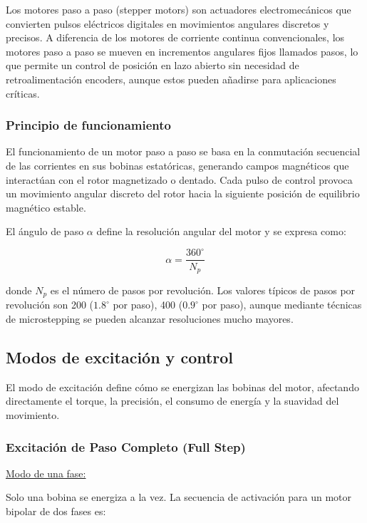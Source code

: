 
Los motores paso a paso (stepper motors) son actuadores electromecánicos que convierten pulsos eléctricos digitales en movimientos angulares discretos y precisos. A diferencia de los motores de corriente continua convencionales, los motores paso a paso se mueven en incrementos angulares fijos llamados pasos, lo que permite un control de posición en lazo abierto sin necesidad de retroalimentación encoders, aunque estos pueden añadirse para aplicaciones críticas.

\subsubsection{Principio de funcionamiento}

El funcionamiento de un motor paso a paso se basa en la conmutación secuencial de las corrientes en sus bobinas estatóricas, generando campos magnéticos que interactúan con el rotor magnetizado o dentado. Cada pulso de control provoca un movimiento angular discreto del rotor hacia la siguiente posición de equilibrio magnético estable.

El ángulo de paso $\alpha$ define la resolución angular del motor y se expresa como:

\begin{equation}
\alpha = \frac{360^\circ}{N_p}
\end{equation}

donde $N_p$ es el número de pasos por revolución. Los valores típicos de pasos por revolución son 200 ($1.8^\circ$ por paso), 400 ($0.9^\circ$ por paso), aunque mediante técnicas de microstepping se pueden alcanzar resoluciones mucho mayores.

\subsection{Modos de excitación y control}

El modo de excitación define cómo se energizan las bobinas del motor, afectando directamente el torque, la precisión, el consumo de energía y la suavidad del movimiento.

\subsubsection{Excitación de Paso Completo (Full Step)}

\underline{Modo de una fase:}

Solo una bobina se energiza a la vez. La secuencia de activación para un motor bipolar de dos fases es:


